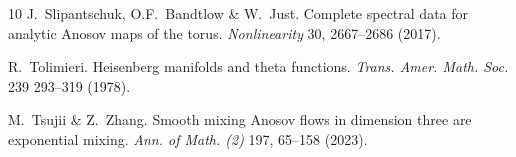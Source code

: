 \documentclass[a4paper,11pt]{amsart}
\theoremstyle{remark}
\begin{document}
\begin{thebibliography}{10}
    J.~Slipantschuk, O.F.~Bandtlow \& W.~Just.
    Complete spectral data for analytic Anosov maps of the torus.
    \emph{Nonlinearity} 30, 2667--2686 (2017).

    R.~Tolimieri.
    Heisenberg manifolds and theta functions.
    \emph{Trans. Amer. Math. Soc.} 239 293--319 (1978).

    M.~Tsujii \& Z.~Zhang.
    Smooth mixing Anosov flows in dimension three are exponential mixing.
    \emph{Ann. of Math. (2)} 197, 65--158 (2023).

\end{thebibliography}
\end{document}
